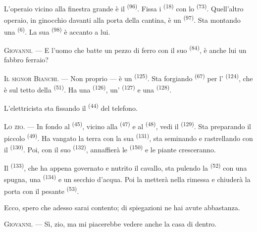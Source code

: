 L'operaio vicino alla finestra grande è il  \textsuperscript{(96)}.
Fissa i  \textsuperscript{(18)} con lo 
\textsuperscript{(73)}. Quell'altro operaio, in ginocchio davanti alla porta della
cantina, è un  \textsuperscript{(97)}. Sta montando una
 \textsuperscript{(6)}. La sua 
\textsuperscript{(98)} è accanto a lui.

\textsc{Giovanni}. --- E l'uomo che batte un pezzo di ferro con il suo
 \textsuperscript{(84)}, è anche lui un fabbro ferraio?

\textsc{Il signor Bianchi}. --- Non proprio --- è un 
\textsuperscript{(125)}. Sta forgiando  \textsuperscript{(67)} per
l' \textsuperscript{(124)}, che è sul tetto della
 \textsuperscript{(51)}. Ha una 
\textsuperscript{(126)}, un' \textsuperscript{(127)} e una
 \textsuperscript{(128)}.

L'elettricista sta fissando il  \textsuperscript{(44)} del
telefono.

\VUsaut{3.0mm}

\textsc{Lo zio}. --- In fondo al  \textsuperscript{(45)}, vicino alla
 \textsuperscript{(47)} e al 
\textsuperscript{(48)}, vedi il  \textsuperscript{(129)}. Sta
preparando il piccolo  \textsuperscript{(49)}. Ha vangato la terra con
la sua  \textsuperscript{(131)}, sta seminando e rastrellando con il
 \textsuperscript{(130)}. Poi, con il suo 
\textsuperscript{(132)}, annaffierà le  \textsuperscript{(150)} e le
piante cresceranno.

Il  \textsuperscript{(133)}, che ha appena governato e nutrito il
cavallo, sta pulendo la  \textsuperscript{(52)} con una spugna, una
 \textsuperscript{(134)} e un secchio d'acqua. Poi la metterà
nella rimessa e chiuderà la porta con il pesante 
\textsuperscript{(53)}.

Ecco, spero che adesso sarai contento; di spiegazioni ne hai avute abbastanza.

\textsc{Giovanni}. --- Sì, zio, ma mi piacerebbe vedere anche la casa di dentro.

